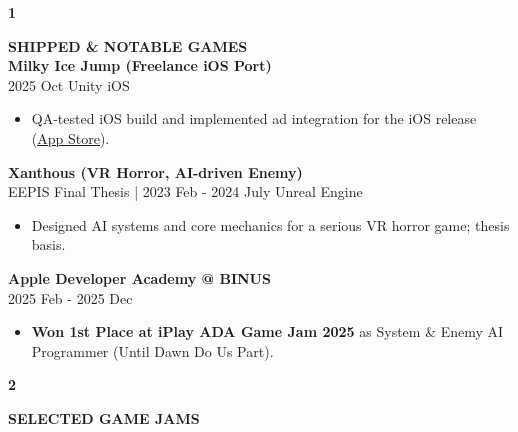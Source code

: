 \documentclass[11pt,a4paper]{article}
\begin{document}
\hspace{1cm}
\begin{minipage}[t]{18cm}

\begin{minipage}[t]{0.8cm}
{\Large\bfseries 1}
\end{minipage}%
\begin{minipage}[t]{17cm}
{\large\bfseries SHIPPED \& NOTABLE GAMES}\\[8pt]

\textbf{Milky Ice Jump (Freelance iOS Port)}\\
{\small 2025 Oct \textbar{} Unity iOS}
\begin{itemize}[leftmargin=*, nosep, itemsep=2pt, topsep=2pt]
    \item QA-tested iOS build and implemented ad integration for the iOS release (\href{https://apps.apple.com/id/app/milky-ice-jump/id6751799679}{\color{accent}\underline{App Store}}).
\end{itemize}

\vspace{0.3cm}

\textbf{Xanthous (VR Horror, AI-driven Enemy)}\\
{\small EEPIS Final Thesis | 2023 Feb - 2024 July \textbar{} Unreal Engine}
\begin{itemize}[leftmargin=*, nosep, itemsep=2pt, topsep=2pt]
    \item Designed AI systems and core mechanics for a serious VR horror game; thesis basis.
\end{itemize}

\vspace{0.3cm}

\textbf{Apple Developer Academy @ BINUS}\\
{\small 2025 Feb - 2025 Dec}
\begin{itemize}[leftmargin=*, nosep, itemsep=2pt, topsep=2pt]
    \item \textbf{Won 1st Place at iPlay ADA Game Jam 2025} as System \& Enemy AI Programmer (Until Dawn Do Us Part).
\end{itemize}

\end{minipage}

\vspace{0.5cm}

\begin{minipage}[t]{0.8cm}
{\Large\bfseries 2}
\end{minipage}%
\begin{minipage}[t]{17cm}
{\large\bfseries SELECTED GAME JAMS}\\[8pt]


\end{minipage}
\end{minipage}
\end{document}
